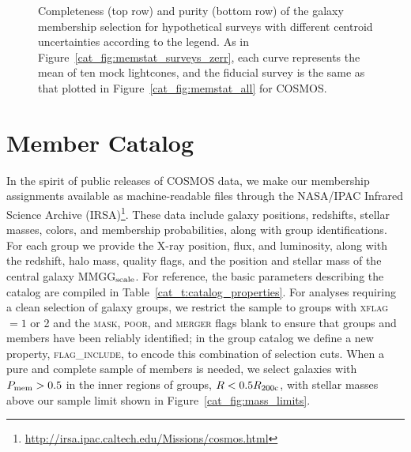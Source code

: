 \begin{figure}
\caption{Completeness (top row) and purity (bottom row) of the galaxy
  membership selection for hypothetical surveys with different
  centroid uncertainties according to the legend. As in
  Figure~\ref{cat_fig:memstat_surveys_zerr}, each curve represents the
  mean of ten mock lightcones, and the fiducial survey is the same as 
  that plotted in Figure~\ref{cat_fig:memstat_all} for COSMOS.}
\label{cat_fig:memstat_surveys_centroid}
\end{figure}



\section{Member Catalog}
\label{cat_s:catalog}

In the spirit of public releases of COSMOS data, we make our
membership assignments available as machine-readable files through the
NASA/IPAC Infrared Science Archive
(IRSA)\footnote{\url{http://irsa.ipac.caltech.edu/Missions/cosmos.html}}.
These data include galaxy positions, redshifts, stellar masses,
colors, and membership probabilities, along with group
identifications. For each group we provide the X-ray position, flux,  
and luminosity, along with the redshift, halo mass, quality flags, and
the position and stellar mass of the central galaxy MMGG$_{\rm scale}$.
For reference, the basic parameters describing the catalog are compiled in
Table~\ref{cat_t:catalog_properties}. For analyses requiring a clean
selection of galaxy groups, we restrict the sample to groups with
\textsc{xflag}~$=1$ or 2 and the \textsc{mask}, \textsc{poor}, and
\textsc{merger} flags blank to ensure that groups
and members have been reliably identified; in the group catalog we
define a new property, \textsc{flag\_include}, to encode this combination of
selection cuts. When a pure and complete
sample of members is needed, we select galaxies with $P_{\rm mem}>0.5$
in the inner regions of groups, $R<0.5\mbox{$R_{200\rm{c}}$}$, with stellar masses
above our sample limit shown in Figure~\ref{cat_fig:mass_limits}.

